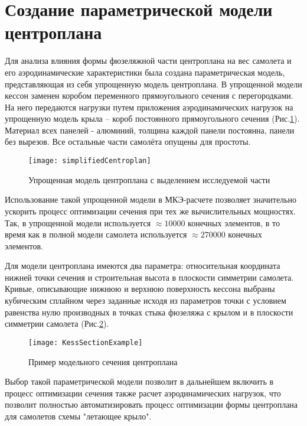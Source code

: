 \section{Создание параметрической модели центроплана}
\label{sec:creationOfModel}

Для анализа влияния формы фюзеляжной части центроплана на вес самолета и его аэродинамические характеристики была создана параметрическая модель, представляющая из себя упрощенную модель центроплана. В упрощенной модели кессон заменен коробом переменного прямоугольного сечения с перегородками. На него передаются нагрузки путем приложения аэродинамических нагрузок на упрощенную модель крыла -- короб постоянного прямоугольного сечения (Рис.\ref{fig:CurvedKessonPatran}). Материал всех панелей - алюминий, толщина каждой панели постоянна, панели без вырезов. Все остальные части самолёта опущены для простоты.  



\begin{figure}[ht]
\centering
\texttt{[image: simplifiedCentroplan]}
\caption{Упрощенная модель центроплана с выделением исследуемой части}
\label{fig:CurvedKessonPatran}
\end{figure}

Использование такой упрощенной модели в МКЭ-расчете позволяет значительно ускорить процесс оптимизации сечения при тех же вычислительных мощностях. Так, в упрощенной модели используется $\approx10000$ конечных элементов, в то время как в полной модели самолета используется $\approx270000$ конечных элементов.

Для модели центроплана имеются два параметра: относительная координата нижней точки сечения и строительная высота в плоскости симметрии самолета. Кривые, описывающие нижнюю и верхнюю поверхность кессона выбраны кубическим сплайном через заданные исходя из параметров точки с условием равенства нулю производных в точках стыка фюзеляжа с крылом и в плоскости симметрии самолета (Рис.\ref{fig:KessSectionExample}).

\begin{figure}[ht]
\centering
\texttt{[image: KessSectionExample]}
\caption{Пример модельного сечения центроплана}
\label{fig:KessSectionExample}
\end{figure}


Выбор такой параметрической модели позволит в дальнейшем включить в процесс оптимизации сечения также расчет аэродинамических нагрузок, что позволит полностью автоматизировать процесс оптимизации формы центроплана для самолетов схемы "летающее крыло". 

